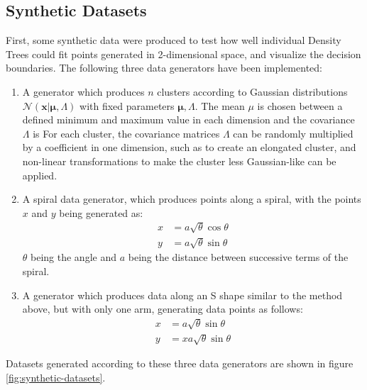 \documentclass[10pt]{article}
\begin{document}
\subsection{Synthetic Datasets}
\label{subsec:data-synthetic}
First, some synthetic data were produced to test how well individual Density Trees could fit points generated in 2-dimensional space, and visualize the decision boundaries. The following three data generators have been implemented:
\begin{enumerate}
    \item A generator which produces $n$ clusters according to Gaussian distributions $\mathcal{N}(\mathbf{x}|\boldsymbol{\mu},\mathtt{\Lambda})$ with fixed parameters $\boldsymbol{\mu},\mathtt{\Lambda}$. The mean $\mu$ is chosen between a defined minimum and maximum value in each dimension and the covariance $\Lambda$ is  For each cluster, the covariance matrices $\Lambda$ can be randomly multiplied by a coefficient in one dimension, such as to create an elongated cluster, and non-linear transformations to make the cluster less Gaussian-like can be applied.
    \item A spiral data generator, which produces points along a spiral, with the points $x$ and $y$ being generated as:
    \begin{equation}
        \begin{aligned}
            x &= a\sqrt{\theta}\cos\theta\\
            y &= a\sqrt{\theta}\sin\theta
        \end{aligned}
    \end{equation}
    $\theta$  being the angle and $a$ being the distance between successive terms of the spiral.
    \item A generator which produces data along an S shape similar to the method above, but with only one arm, generating data points as follows:
    \begin{equation}
        \begin{aligned}
            x &= a\sqrt{\theta}\sin\theta\\
            y &= xa\sqrt{\theta}\sin\theta
        \end{aligned}
    \end{equation}
\end{enumerate}

Datasets generated according to these three data generators are shown in figure \ref{fig:synthetic-datasets}.
\end{document}
